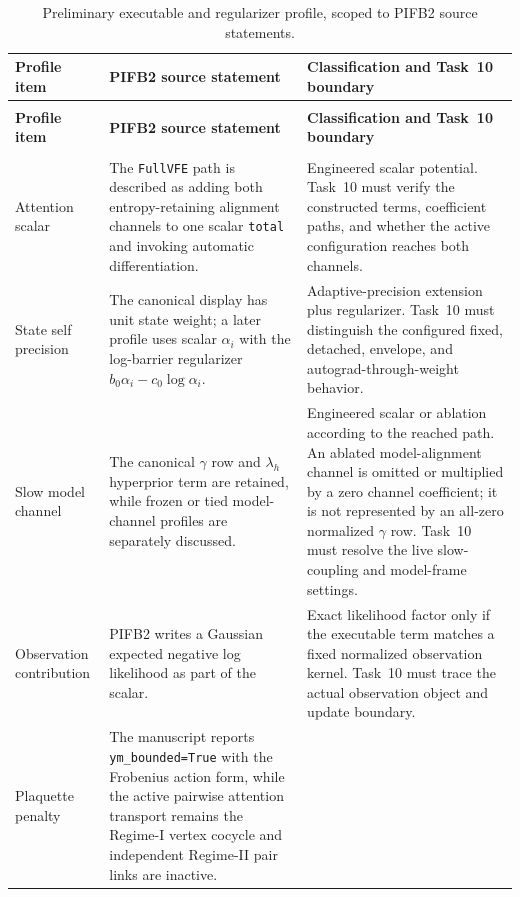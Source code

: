 \small
\begin{longtable}{>{\raggedright\arraybackslash}p{}>{\raggedright\arraybackslash}p{}>{\raggedright\arraybackslash}p{}}
\caption{Preliminary executable and regularizer profile, scoped to PIFB2 source statements.}
\label{tab:pifb2-source-scoped-profile}\\
\toprule
\textbf{Profile item} & \textbf{PIFB2 source statement} & \textbf{Classification and Task~10 boundary} \\
\midrule
\endfirsthead
\multicolumn{3}{l}{\textit{Table \thetable\ continued}}\\
\toprule
\textbf{Profile item} & \textbf{PIFB2 source statement} & \textbf{Classification and Task~10 boundary} \\
\midrule
\endhead
\midrule
\multicolumn{3}{r}{\textit{Continued on next page}}\\
\endfoot
\bottomrule
\endlastfoot
Attention scalar &
The \texttt{FullVFE} path is described as adding both entropy-retaining alignment channels to one scalar \texttt{total} and invoking automatic differentiation. &
Engineered scalar potential. Task~10 must verify the constructed terms, coefficient paths, and whether the active configuration reaches both channels.\\
State self precision &
The canonical display has unit state weight; a later profile uses scalar \(\alpha_i\) with the log-barrier regularizer \(b_0\alpha_i-c_0\log\alpha_i\). &
Adaptive-precision extension plus regularizer. Task~10 must distinguish the configured fixed, detached, envelope, and autograd-through-weight behavior.\\
Slow model channel &
The canonical \(\gamma\) row and \(\lambda_h\) hyperprior term are retained, while frozen or tied model-channel profiles are separately discussed. &
Engineered scalar or ablation according to the reached path. An ablated model-alignment channel is omitted or multiplied by a zero channel coefficient; it is not represented by an all-zero normalized \(\gamma\) row. Task~10 must resolve the live slow-coupling and model-frame settings.\\
Observation contribution &
PIFB2 writes a Gaussian expected negative log likelihood as part of the scalar. &
Exact likelihood factor only if the executable term matches a fixed normalized observation kernel. Task~10 must trace the actual observation object and update boundary.\\
Plaquette penalty &
The manuscript reports \texttt{ym\_bounded=True} with the Frobenius action form, while the active pairwise attention transport remains the Regime-I vertex cocycle and independent Regime-II pair links are inactive. &

\end{longtable}
